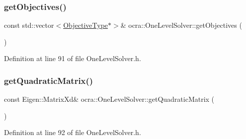 \hypertarget{classocra_1_1OneLevelSolver_aa3f845cd1331b379caea0f5b6e621a59}{}\label{classocra_1_1OneLevelSolver_aa3f845cd1331b379caea0f5b6e621a59} 
\subsubsection{\texorpdfstring{get\+Objectives()}{getObjectives()}}
{\footnotesize\ttfamily const std\+::vector$<$\hyperlink{classocra_1_1OneLevelSolver_a93b0be052a859bbd4c81584aa1646ffb}{Objective\+Type}$\ast$$>$\& ocra\+::\+One\+Level\+Solver\+::get\+Objectives (\begin{DoxyParamCaption}{ }\end{DoxyParamCaption})\hspace{0.3cm}{\ttfamily [inline]}}



Definition at line 91 of file One\+Level\+Solver.\+h.

\hypertarget{classocra_1_1OneLevelSolver_a36a51b6eb94fecd84bd0e30f3141ad57}{}\label{classocra_1_1OneLevelSolver_a36a51b6eb94fecd84bd0e30f3141ad57} 
\subsubsection{\texorpdfstring{get\+Quadratic\+Matrix()}{getQuadraticMatrix()}}
{\footnotesize\ttfamily const Eigen\+::\+Matrix\+Xd\& ocra\+::\+One\+Level\+Solver\+::get\+Quadratic\+Matrix (\begin{DoxyParamCaption}{ }\end{DoxyParamCaption})\hspace{0.3cm}{\ttfamily [inline]}}



Definition at line 92 of file One\+Level\+Solver.\+h.

\hypertarget{classocra_1_1OneLevelSolver_a90ab0f4140d37e519adfb37d74864061}{}\label{classocra_1_1OneLevelSolver_a90ab0f4140d37e519adfb37d74864061} 

